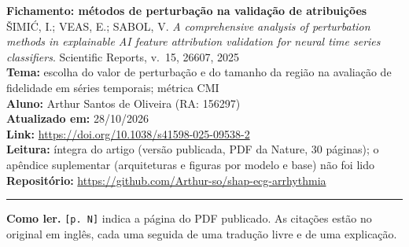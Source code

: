 \documentclass[11pt,a4paper]{article}
\begin{document}
\begin{center}
    {\LARGE \textbf{Fichamento: métodos de perturbação na validação de atribuições}} \\[0.35em]
    {\large ŠIMIĆ, I.; VEAS, E.; SABOL, V. \textit{A comprehensive analysis of perturbation methods in explainable AI feature attribution validation for neural time series classifiers}. Scientific Reports, v.~15, 26607, 2025} \\[0.3em]
    \textbf{Tema:} escolha do valor de perturbação e do tamanho da região na avaliação de fidelidade em séries temporais; métrica CMI \\[0.2em]
    \textbf{Aluno:} Arthur Santos de Oliveira (RA: 156297) \\[0.2em]
    \textbf{Atualizado em:} 28/10/2026 \\[0.2em]
    \textbf{Link:} \url{https://doi.org/10.1038/s41598-025-09538-2} \\[0.2em]
    \textbf{Leitura:} íntegra do artigo (versão publicada, PDF da Nature, 30 páginas); o apêndice suplementar (arquiteturas e figuras por modelo e base) não foi lido \\[0.2em]
    \textbf{Repositório:} \url{https://github.com/Arthur-so/shap-ecg-arrhythmia}
\end{center}
\vspace{-0.5em}
\hrule
\vspace{0.8em}

\textbf{Como ler.} \texttt{[p. N]} indica a página do PDF publicado. As citações estão no original em inglês, cada uma seguida de uma tradução livre e de uma explicação.
\end{document}
